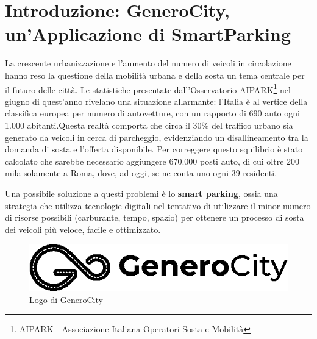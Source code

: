 \chapter{Introduzione: GeneroCity, un'Applicazione di SmartParking}

La crescente urbanizzazione e l'aumento del numero di veicoli in circolazione hanno reso la questione della mobilità urbana e della sosta un tema centrale per il futuro delle città. 
Le statistiche presentate dall'Osservatorio AIPARK\footnote{AIPARK - Associazione Italiana Operatori Sosta e Mobilità} nel giugno di quest'anno rivelano una situazione allarmante: l'Italia è al vertice della classifica europea per numero di autovetture, con un rapporto di 690 auto ogni 1.000 abitanti.Questa realtà comporta che circa il 30\% del traffico urbano sia generato da veicoli in cerca di parcheggio, evidenziando un disallineamento tra la domanda di sosta e l'offerta disponibile. Per correggere questo squilibrio è stato calcolato che sarebbe necessario aggiungere 670.000 posti auto, di cui oltre 200 mila solamente a Roma, dove, ad oggi, se ne conta uno ogni 39 residenti.\cite{ref:AIPARK}

Una possibile soluzione a questi problemi è lo \textbf{smart parking}, ossia una strategia che utilizza tecnologie digitali nel tentativo di utilizzare il minor numero di risorse possibili (carburante, tempo, spazio) per ottenere un processo di sosta dei veicoli più veloce, facile e ottimizzato.\cite{ref:smartparking}

\begin{figure}[h]
    \centering
    \includegraphics[width=0.5\linewidth]{images/gc_logo.png}
    \caption{Logo di GeneroCity}
    \label{fig:gc_logo}
\end{figure}
